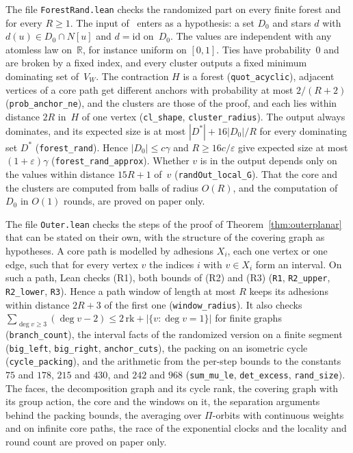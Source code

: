\documentclass[11pt]{article}
\theoremstyle{remark}
\begin{document}
The file \texttt{ForestRand.lean} checks the randomized part on every finite forest and for every
$R\ge1$. The input of~\cite{LOW08} enters as a hypothesis: a set $D_0$ and stars $d$ with
$d(u)\in D_0\cap N[u]$ and $d=\mathrm{id}$ on~$D_0$. The values are independent with any atomless law
on~$\mathbb R$, for instance uniform on $[0,1]$. Ties have probability~$0$ and are broken by a fixed
index, and every cluster outputs a fixed minimum dominating set of~$V_W$. The contraction $H$ is a
forest (\texttt{quot\_acyclic}), adjacent vertices of a core path get different anchors with
probability at most $2/(R+2)$ (\texttt{prob\_anchor\_ne}), and the clusters are those of the proof,
and each lies within distance $2R$ in~$H$ of one vertex (\texttt{cl\_shape},
\texttt{cluster\_radius}). The output always
dominates, and its expected size is at most $|D^*|+16|D_0|/R$ for every dominating set $D^*$
(\texttt{forest\_rand}). Hence $|D_0|\le c\gamma$ and $R\ge16c/\varepsilon$ give expected size at
most $(1+\varepsilon)\gamma$ (\texttt{forest\_rand\_approx}). Whether $v$ is in the output depends
only on the values within distance $15R+1$ of~$v$ (\texttt{randOut\_local\_G}). That the core and
the clusters are computed from balls of radius $O(R)$, and the computation of $D_0$ in $O(1)$
rounds, are proved on paper only.

The file \texttt{Outer.lean} checks the steps of the proof of Theorem~\ref{thm:outerplanar} that can
be stated on their own, with the structure of the covering graph as hypotheses. A core path is
modelled by adhesions $X_i$, each one vertex or one edge, such that for every vertex $v$ the indices
$i$ with $v\in X_i$ form an interval. On such a path, Lean checks (R1), both bounds of (R2) and (R3)
(\texttt{R1}, \texttt{R2\_upper}, \texttt{R2\_lower}, \texttt{R3}). Hence a path window of length at
most $R$ keeps its adhesions within distance $2R+3$ of the first one (\texttt{window\_radius}). It
also checks $\sum_{\deg v\ge3}(\deg v-2)\le2\,\mathrm{rk}+|\{v:\deg v=1\}|$ for finite graphs
(\texttt{branch\_count}), the interval facts of the randomized version on a finite segment
(\texttt{big\_left}, \texttt{big\_right}, \texttt{anchor\_cuts}), the packing on an isometric cycle
(\texttt{cycle\_packing}), and the arithmetic from the per-step bounds to the constants $75$ and
$178$, $215$ and $430$, and $242$ and $968$ (\texttt{sum\_mu\_le}, \texttt{det\_excess},
\texttt{rand\_size}). The faces, the decomposition graph and its cycle rank, the covering graph with
its group action, the core and the windows on it, the separation arguments behind the packing bounds,
the averaging over $\Pi$-orbits with continuous weights and on infinite core paths, the race of the
exponential clocks and the locality and round count are proved on paper only.
\end{document}
